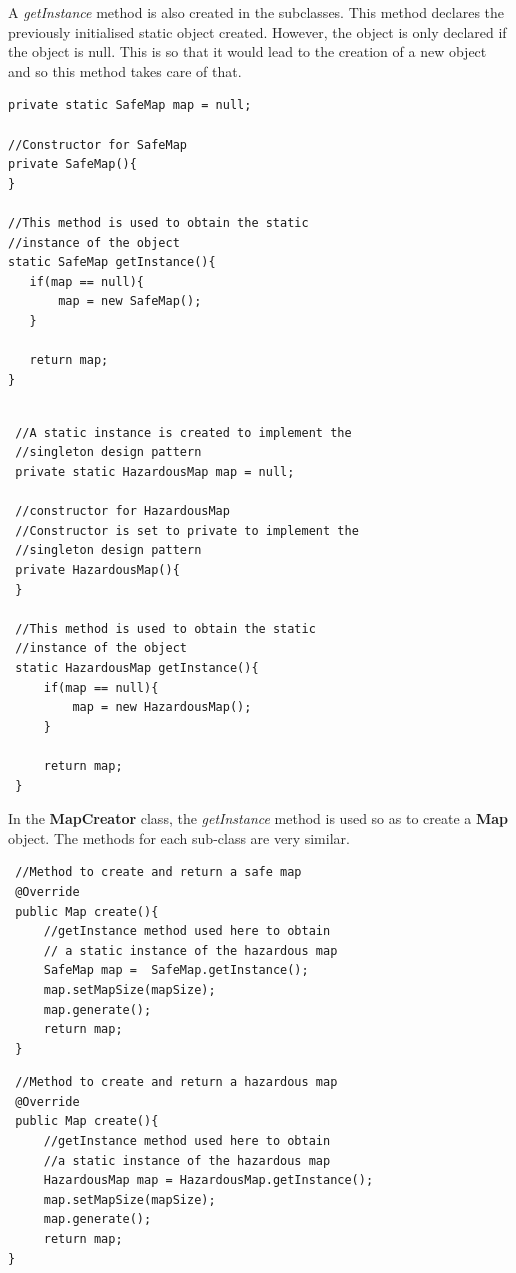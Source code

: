 \documentclass[a4paper,12pt]{extarticle}
\begin{document}
\noindent A \textit{getInstance} method is also created in the subclasses. This method declares the previously initialised static object created. However, the object is only declared if the object is null. This is so that it would lead to the creation of a new object and so this method takes care of that.\\

\begin{lstlisting}
private static SafeMap map = null;

//Constructor for SafeMap
private SafeMap(){
}

//This method is used to obtain the static 
//instance of the object
static SafeMap getInstance(){
   if(map == null){
       map = new SafeMap();
   }

   return map;
}
    
\end{lstlisting}
\vspace{4mm}

\newpage
\begin{lstlisting}
 //A static instance is created to implement the 
 //singleton design pattern
 private static HazardousMap map = null;

 //constructor for HazardousMap
 //Constructor is set to private to implement the 
 //singleton design pattern
 private HazardousMap(){
 }

 //This method is used to obtain the static 
 //instance of the object
 static HazardousMap getInstance(){
     if(map == null){
         map = new HazardousMap();
     }

     return map;
 }

\end{lstlisting}
\vspace{4mm}

\noindent In the \textbf{MapCreator} class, the \textit{getInstance} method is used so as to create a \textbf{Map} object. The methods for each sub-class are very similar.

\begin{lstlisting}
 //Method to create and return a safe map
 @Override
 public Map create(){
     //getInstance method used here to obtain
     // a static instance of the hazardous map
     SafeMap map =  SafeMap.getInstance();
     map.setMapSize(mapSize);
     map.generate();
     return map;
 }
\end{lstlisting}
\vspace{4mm}

\begin{lstlisting}
 //Method to create and return a hazardous map
 @Override
 public Map create(){
     //getInstance method used here to obtain 
     //a static instance of the hazardous map
     HazardousMap map = HazardousMap.getInstance();
     map.setMapSize(mapSize);
     map.generate();
     return map;
}
\end{lstlisting}
\vspace{4mm}
\end{document}
